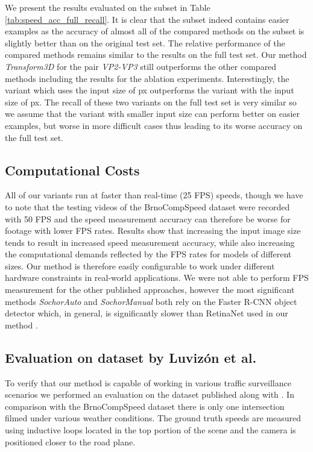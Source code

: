 \documentclass[twocolumn]{svjour3}          \smartqed  \usepackage{graphicx}
\begin{document}
We present the results evaluated on the subset in Table \ref{tab:speed_acc_full_recall}. It is clear that the subset indeed contains easier examples as the accuracy of almost all of the compared methods on the subset is slightly better than on the original test set. The relative performance of the compared methods remains similar to the results on the full test set. Our method \textit{Transform3D} for the pair \textit{VP2-VP3} still outperforms the other compared methods including the results for the ablation experiments. Interestingly, the variant which uses the input size of  px outperforms the variant with the input size of  px. The recall of these two variants on the full test set is very similar so we assume that the variant with smaller input size can perform better on easier examples, but worse in more difficult cases thus leading to its worse accuracy on the full test set.


\subsection{Computational Costs}

All of our variants run at faster than real-time (25 FPS) speeds, though we have to note that the testing videos of the BrnoCompSpeed dataset were recorded with 50 FPS and the speed measurement accuracy can therefore be worse for footage with lower FPS rates. Results show that increasing the input image size tends to result in increased speed measurement accuracy, while also increasing the computational demands reflected by the FPS rates for models of different sizes. Our method is therefore easily configurable to work under different hardware constraints in real-world applications. We were not able to perform FPS measurement for the other published approaches, however the most significant methods \textit{SochorAuto} and \textit{SochorManual} both rely on the Faster R-CNN object detector which, in general, is significantly slower than RetinaNet used in our method \cite{RetinaNet}.

\subsection{Evaluation on dataset by Luviz\'{o}n et al.}

To verify that our method is capable of working in various traffic surveillance scenarios we performed an evaluation on the dataset published along with \cite{luvizon}. In comparison with the BrnoCompSpeed dataset \cite{brnocompspeed} there is only one intersection filmed under various weather conditions. The ground truth speeds are measured using inductive loops located in the top portion of the scene and the camera is positioned closer to the road plane.
\end{document}
